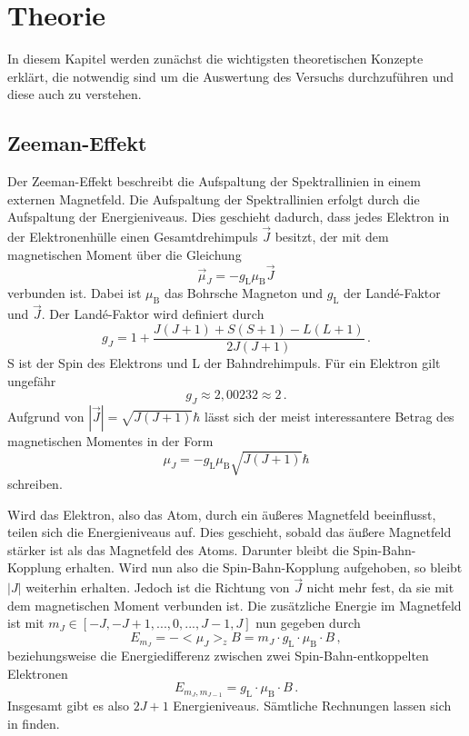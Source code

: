 \section{Theorie}
\label{sec:Theorie}

In diesem Kapitel werden zunächst die wichtigsten theoretischen Konzepte erklärt, die notwendig sind um die Auswertung des Versuchs durchzuführen
und diese auch zu verstehen.

\subsection{Zeeman-Effekt}

Der Zeeman-Effekt beschreibt die Aufspaltung der Spektrallinien in einem externen Magnetfeld.
Die Aufspaltung der Spektrallinien erfolgt durch die Aufspaltung der Energieniveaus.
Dies geschieht dadurch, dass jedes Elektron in der Elektronenhülle einen Gesamtdrehimpuls $\vec{J}$ besitzt,
der mit dem magnetischen Moment über die Gleichung
\begin{equation*}
    \vec{\mu}_J = - g_\text{L} \mu_\text{B} \vec{J}
\end{equation*}
verbunden ist.
Dabei ist $\mu_\text{B}$ das Bohrsche Magneton und $g_\text{L}$ der Landé-Faktor und $\vec{J}$.
Der Landé-Faktor wird definiert durch 
\begin{equation*}
    g_J = 1 + \frac{J(J+1) + S(S+1) - L(L+1)}{2 J(J+1)} \, .
\end{equation*}
S ist der Spin des Elektrons und L der Bahndrehimpuls.
Für ein Elektron gilt ungefähr
\begin{equation*}
    g_J \approx 2,00232 \approx 2 \, .
\end{equation*}
Aufgrund von $|\vec{J}| = \sqrt{J(J+1)} \hbar$ lässt sich der meist interessantere Betrag des magnetischen Momentes in der Form
\begin{equation*}
   \mu_J = - g_\text{L} \mu_\text{B} \sqrt{J(J+1)} \hbar
\end{equation*}
schreiben.

Wird das Elektron, also das Atom, durch ein äußeres Magnetfeld beeinflusst, teilen sich die Energieniveaus auf.
Dies geschieht, sobald das äußere Magnetfeld stärker ist als das Magnetfeld des Atoms.
Darunter bleibt die Spin-Bahn-Kopplung erhalten.
Wird nun also die Spin-Bahn-Kopplung aufgehoben, so bleibt $|J|$ weiterhin erhalten.
Jedoch ist die Richtung von $\vec{J}$ nicht mehr fest, da sie mit dem magnetischen Moment verbunden ist.
Die zusätzliche Energie im Magnetfeld ist mit $m_J \in [-J, -J+1,...,0,...,J-1, J]$ nun gegeben durch
\begin{equation}
    E_{m_J} = - <\mu_J>_z B = m_J \cdot g_\text{L} \cdot \mu_\text{B} \cdot B \, ,
\end{equation}
beziehungsweise die Energiedifferenz zwischen zwei Spin-Bahn-entkoppelten Elektronen
\begin{equation}
    E_{m_J,m_{J-1}} = g_\text{L} \cdot \mu_\text{B}\cdot B \, .
\end{equation}
Insgesamt gibt es also $2J+1$ Energieniveaus.
Sämtliche Rechnungen lassen sich in \cite{demtroeder3} finden.


